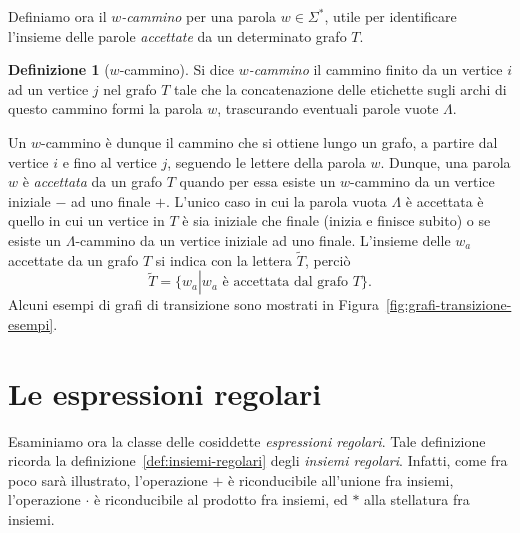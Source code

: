 \documentclass[10pt]{\classname}
\theoremstyle{definition}
\newtheorem{definizione}{Definizione}[section]
\theoremstyle{definition}
\theoremstyle{definition}
\theoremstyle{definition}
\begin{document}
Definiamo ora il \emph{$w$-cammino} per una parola $w \in \Sigma^*$, utile per identificare l'insieme delle parole \emph{accettate} da un determinato grafo $T$.

\begin{definizione}[$w$-cammino]
    Si dice \emph{$w$-cammino} il cammino finito da un vertice $i$ ad un vertice $j$ nel grafo $T$ tale che la concatenazione delle etichette sugli archi di questo cammino formi la parola $w$, trascurando eventuali parole vuote $\Lambda$. 
\end{definizione}

Un $w$-cammino è dunque il cammino che si ottiene lungo un grafo, a partire dal vertice $i$ e fino al vertice $j$, seguendo le lettere della parola $w$. Dunque, una parola $w$ è \emph{accettata} da un grafo $T$ quando per essa esiste un $w$-cammino da un vertice iniziale $-$ ad uno finale $+$. L'unico caso in cui la parola vuota $\Lambda$ è accettata è quello in cui un vertice in $T$ è sia iniziale che finale (inizia e finisce subito) o se esiste un $\Lambda$-cammino da un vertice iniziale ad uno finale. L'insieme delle $w_a$ accettate da un grafo $T$ si indica con la lettera $\tilde{T}$, perciò \[\tilde T = \{w_a \left|\right. w_a \mbox{ è accettata dal grafo } T\}.\] Alcuni esempi di grafi di transizione sono mostrati in Figura~\ref{fig:grafi-transizione-esempi}.


\section{Le espressioni regolari}

Esaminiamo ora la classe delle cosiddette \emph{espressioni regolari}. Tale definizione ricorda la definizione~\ref{def:insiemi-regolari} degli \emph{insiemi regolari}. Infatti, come fra poco sarà illustrato, l'operazione $+$ è riconducibile all'unione fra insiemi, l'operazione $\cdot$ è riconducibile al prodotto fra insiemi, ed $*$ alla stellatura fra insiemi.
\end{document}
